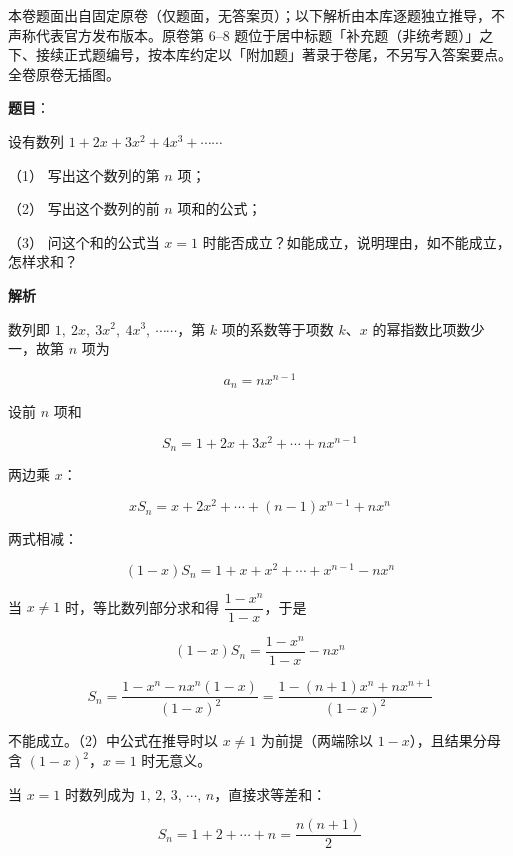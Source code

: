

\begin{gktip}
本卷题面出自固定原卷（仅题面，无答案页）；以下解析由本库逐题独立推导，不声称代表官方发布版本。原卷第 6–8 题位于居中标题「补充题（非统考题）」之下、接续正式题编号，按本库约定以「附加题」著录于卷尾，不另写入答案要点。全卷原卷无插图。
\end{gktip}

\begin{answer}

\textbf{题目}：

设有数列 $1+2x+3x^2+4x^3+\cdots\cdots$

（1） 写出这个数列的第 $n$ 项；

（2） 写出这个数列的前 $n$ 项和的公式；

（3） 问这个和的公式当 $x=1$ 时能否成立？如能成立，说明理由，如不能成立，怎样求和？

\textbf{解析}


数列即 $1,\ 2x,\ 3x^2,\ 4x^3,\ \cdots\cdots$，第 $k$ 项的系数等于项数 $k$、$x$ 的幂指数比项数少一，故第 $n$ 项为

\nopagebreak[4]
\[
a_n=nx^{n-1}
\]


设前 $n$ 项和

\nopagebreak[4]
\[
S_n=1+2x+3x^2+\cdots+nx^{n-1}
\]

两边乘 $x$：

\nopagebreak[4]
\[
xS_n=x+2x^2+\cdots+(n-1)x^{n-1}+nx^n
\]

两式相减：

\nopagebreak[4]
\[
(1-x)S_n=1+x+x^2+\cdots+x^{n-1}-nx^n
\]

当 $x\neq1$ 时，等比数列部分求和得 $\dfrac{1-x^n}{1-x}$，于是

\nopagebreak[4]
\[
(1-x)S_n=\frac{1-x^n}{1-x}-nx^n
\]

\nopagebreak[4]
\[
S_n=\frac{1-x^n-nx^n(1-x)}{(1-x)^2}
=\frac{1-(n+1)x^n+nx^{n+1}}{(1-x)^2}
\]


不能成立。（2）中公式在推导时以 $x\neq1$ 为前提（两端除以 $1-x$），且结果分母含 $(1-x)^2$，$x=1$ 时无意义。

当 $x=1$ 时数列成为 $1,\,2,\,3,\,\cdots,\,n$，直接求等差和：

\nopagebreak[4]
\[
S_n=1+2+\cdots+n=\frac{n(n+1)}{2}
\]




\end{answer}
